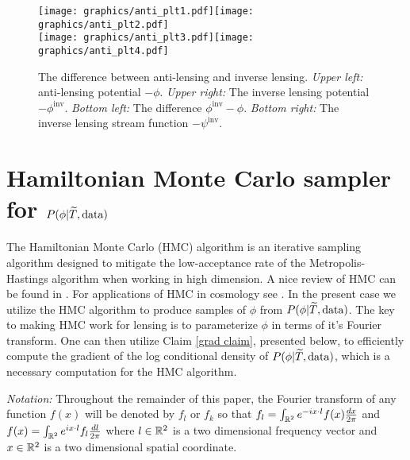 \documentclass[noinfoline]{imsart}
\begin{document}
\begin{figure}[t]
\label{antilensing plots}
\texttt{[image: graphics/anti\_plt1.pdf]}\texttt{[image: graphics/anti\_plt2.pdf]}\\%
\texttt{[image: graphics/anti\_plt3.pdf]}\texttt{[image: graphics/anti\_plt4.pdf]}
\caption{The difference between anti-lensing and inverse lensing. {\em Upper left:} anti-lensing potential $-\phi$. {\em Upper right:} The inverse lensing potential $-\phi^\text{inv}$. {\em Bottom left:} The difference $\phi^\text{inv}-\phi$. {\em Bottom right:} The inverse lensing stream function $-\psi^\text{inv}$.}
\end{figure}








%
%
\section{Hamiltonian Monte Carlo sampler for $P(\phi | \widetilde T,  \text{\rm data})$}
\label{Section: hamiltonian sampler section}


The Hamiltonian Monte Carlo (HMC) algorithm is an iterative sampling algorithm designed to mitigate the low-acceptance rate of the Metropolis-Hastings algorithm when working in high dimension. 
A nice review of HMC can be found in \cite{neal2011mcmc}. For applications of HMC in cosmology see \cite{PhysRevD.75.083525, taylor2008fast, elsner2010local, 2010MNRAS.409..355J, 2012MNRAS.425.1042J, jasche2013bayesian, jasche2013methods}. In the present case we utilize the HMC algorithm to produce samples of $\phi$ from $P(\phi | \widetilde T,  \text{\rm data})$.  The key to making HMC work for lensing is to parameterize  $\phi$ in terms of it's Fourier transform. One can then utilize  Claim \ref{grad claim}, presented below, to efficiently compute the gradient of the log conditional density of $P(\phi | \widetilde T,  \text{\rm data})$, which is a necessary computation for the HMC algorithm.

{\em Notation:} Throughout the remainder of this paper, the Fourier transform of any function $f(x)$ will be denoted by $f_l$ or $f_k$ so that $f_l  =  \int_{\Bbb R^2} e^{-i x\cdot l}  f(x)\frac{dx}{2\pi}$ and
$f(x) =  \int_{\Bbb R^2} e^{i x\cdot l}  f_l \frac{dl}{2\pi}$ 
where $l\in \Bbb R^2$ is a two dimensional frequency vector and $x\in \Bbb R^2$  is a two dimensional spatial coordinate.
\end{document}
